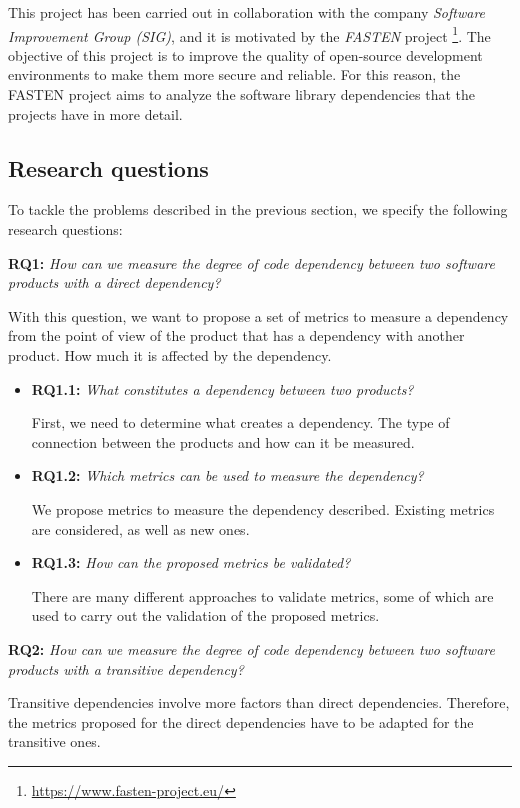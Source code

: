 This project has been carried out in collaboration with the company \textit{Software Improvement Group (SIG)}, and it is motivated by the \textit{FASTEN} project \footnote{\url{https://www.fasten-project.eu/}}. The objective of this project is to improve the quality of open-source development environments to make them more secure and reliable. For this reason, the FASTEN project aims to analyze the software library dependencies that the projects have in more detail.

\subsection{Research questions}
To tackle the problems described in the previous section, we specify the following research questions:

\blankl
\textbf{RQ1:} \textit{How can we measure the degree of code dependency between two software products with a direct dependency?}

\blankls
With this question, we want to propose a set of metrics to measure a dependency from the point of view of the product that has a dependency with another product. How much it is affected by the dependency.

\begin{itemize}
  \item \textbf{RQ1.1:} \textit{What constitutes a dependency between two products?}

  First, we need to determine what creates a dependency. The type of connection between the products and how can it be measured.

  \item \textbf{RQ1.2:} \textit{Which metrics can be used to measure the dependency?}

  We propose metrics to measure the dependency described. Existing metrics are considered, as well as new ones.

  \item \textbf{RQ1.3:} \textit{How can the proposed metrics be validated?}

  There are many different approaches to validate metrics, some of which are used to carry out the validation of the proposed metrics.
\end{itemize}

\blankl
\textbf{RQ2:} \textit{How can we measure the degree of code dependency between two software products with a transitive dependency?}

\blankls
Transitive dependencies involve more factors than direct dependencies. Therefore, the metrics proposed for the direct dependencies have to be adapted for the transitive ones.

